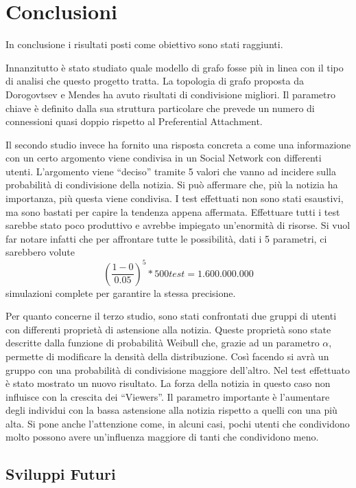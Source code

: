 \section{Conclusioni}
\label{section:conclusioni}

In conclusione i risultati posti come obiettivo sono stati raggiunti.

Innanzitutto è stato studiato quale modello di grafo fosse più in linea con il tipo di 
analisi che questo progetto tratta.
La topologia di grafo proposta da Dorogovtsev e Mendes ha avuto risultati di condivisione migliori. 
Il parametro chiave è definito dalla sua struttura particolare che 
prevede un numero di connessioni quasi doppio rispetto al Preferential Attachment.

Il secondo studio invece ha fornito una risposta concreta a come una informazione con un certo argomento 
viene condivisa in un Social Network con differenti utenti.
L'argomento viene ``deciso'' tramite 5 valori che vanno ad incidere sulla probabilità di condivisione della notizia.
Si può affermare che, più la notizia ha importanza, più questa viene condivisa.
I test effettuati non sono stati esaustivi, ma sono bastati per capire la tendenza appena affermata.
Effettuare tutti i test sarebbe stato poco produttivo e avrebbe impiegato un'enormità di risorse.
Si vuol far notare infatti che per affrontare tutte le possibilità, dati i 5 parametri, ci sarebbero volute
\[
  \left(\frac{1 - 0}{0.05}\right)^5 * 500 test = 1.600.000.000
\]
simulazioni complete per garantire la stessa precisione. 

Per quanto concerne il terzo studio, sono stati confrontati due gruppi di utenti con differenti 
proprietà di astensione alla notizia. Queste proprietà sono state descritte dalla funzione di probabilità 
Weibull che, grazie ad un parametro $\alpha$, permette di modificare la densità della distribuzione.
Così facendo si avrà un gruppo con una probabilità di condivisione maggiore dell'altro.
Nel test effettuato è stato mostrato un nuovo risultato. 
La forza della notizia in questo caso non influisce con la crescita dei ``Viewers''.
Il parametro importante è l'aumentare degli individui con la bassa astensione alla notizia rispetto a quelli
con una più alta.
Si pone anche l'attenzione come, in alcuni casi, pochi utenti che condividono molto possono avere un'influenza 
maggiore di tanti che condividono meno.


\subsection{Sviluppi Futuri}

